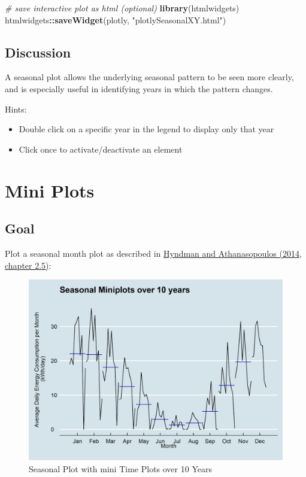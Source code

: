 \documentclass[
  a4paperpaper,
]{book}
\newenvironment{Shaded}{\begin{snugshade}}{\end{snugshade}}
\newcommand{\CommentTok}[1]{\textcolor[rgb]{0.56,0.35,0.01}{\textit{#1}}}
\newcommand{\KeywordTok}[1]{\textcolor[rgb]{0.13,0.29,0.53}{\textbf{#1}}}
\newcommand{\NormalTok}[1]{#1}
\newcommand{\OperatorTok}[1]{\textcolor[rgb]{0.81,0.36,0.00}{\textbf{#1}}}
\newcommand{\StringTok}[1]{\textcolor[rgb]{0.31,0.60,0.02}{#1}}
\providecommand{\tightlist}{%
  \setlength{\itemsep}{0pt}\setlength{\parskip}{0pt}}
\let\oldShaded\Shaded
\let\endoldShaded\endShaded
\renewenvironment{Shaded}{\footnotesize\oldShaded}{\endoldShaded}
\begin{document}
\begin{Shaded}
\begin{Highlighting}[]
\CommentTok{# save interactive plot as html (optional)}
\KeywordTok{library}\NormalTok{(htmlwidgets)}
\NormalTok{htmlwidgets}\OperatorTok{::}\KeywordTok{saveWidget}\NormalTok{(plotly, }\StringTok{"plotlySeasonalXY.html"}\NormalTok{)}
\end{Highlighting}
\end{Shaded}

\hypertarget{discussion-1}{%
\subsection{Discussion}\label{discussion-1}}

A seasonal plot allows the underlying seasonal pattern to be seen more clearly, and is especially useful in identifying years in which the pattern changes.

Hints:

\begin{itemize}
\tightlist
\item
  Double click on a specific year in the legend to display only that year
\item
  Click once to activate/deactivate an element
\end{itemize}

\newpage

\hypertarget{mini-plots}{%
\section{Mini Plots}\label{mini-plots}}

\hypertarget{goal-7}{%
\subsection{Goal}\label{goal-7}}

Plot a seasonal month plot as described in \href{https://otexts.com/fpp2/seasonal-subseries-plots.html}{Hyndman and Athanasopoulos (2014, chapter 2.5)}:

\begin{figure}
\includegraphics[width=0.7\linewidth]{images/plotSeasonalMiniplots} \caption{Seasonal Plot with mini Time Plots over 10 Years}\label{fig:unnamed-chunk-16}
\end{figure}
\end{document}
